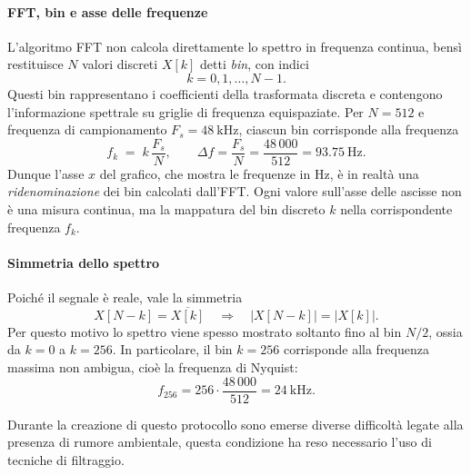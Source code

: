 \paragraph{FFT, bin e asse delle frequenze}
L'algoritmo FFT non calcola direttamente lo spettro in frequenza continua, bensì restituisce $N$ valori discreti $X[k]$ detti \emph{bin}, con indici
\[
k=0,1,\dots,N-1.
\]
Questi bin rappresentano i coefficienti della trasformata discreta e contengono l’informazione spettrale su griglie di frequenza equispaziate. 
Per $N=512$ e frequenza di campionamento $F_s=48~\mathrm{kHz}$, ciascun bin corrisponde alla frequenza
\[
f_k \;=\; k\,\frac{F_s}{N},
\qquad \Delta f = \frac{F_s}{N} = \frac{48\,000}{512} = 93.75~\mathrm{Hz}.
\]
Dunque l’asse $x$ del grafico, che mostra le frequenze in Hz, è in realtà una \emph{ridenominazione} dei bin calcolati dall’FFT. 
Ogni valore sull’asse delle ascisse non è una misura continua, ma la mappatura del bin discreto $k$ nella corrispondente frequenza $f_k$.

\paragraph{Simmetria dello spettro}
Poiché il segnale è reale, vale la simmetria
\[
X[N-k] = \overline{X[k]} \quad \Rightarrow \quad |X[N-k]|=|X[k]|.
\]
Per questo motivo lo spettro viene spesso mostrato soltanto fino al bin $N/2$, ossia da $k=0$ a $k=256$. 
In particolare, il bin $k=256$ corrisponde alla frequenza massima non ambigua, cioè la frequenza di Nyquist:
\[
f_{256} = 256 \cdot \frac{48\,000}{512} = 24~\mathrm{kHz}.
\]

Durante la creazione di questo protocollo sono emerse diverse difficoltà legate alla presenza di rumore ambientale,
questa condizione ha reso necessario l'uso di tecniche di filtraggio.
